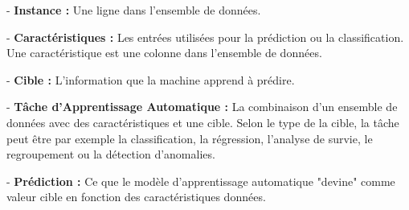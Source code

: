 - \textbf{Instance :} Une ligne dans l'ensemble de données.

- \textbf{Caractéristiques :} Les entrées utilisées pour la prédiction ou la classification. Une caractéristique est une colonne dans l'ensemble de données.

- \textbf{Cible :} L'information que la machine apprend à prédire.

- \textbf{Tâche d'Apprentissage Automatique :} La combinaison d'un ensemble de données avec des caractéristiques et une cible. Selon le type de la cible, la tâche peut être par exemple la classification, la régression, l'analyse de survie, le regroupement ou la détection d'anomalies.

- \textbf{Prédiction :} Ce que le modèle d'apprentissage automatique "devine" comme valeur cible en fonction des caractéristiques données.

